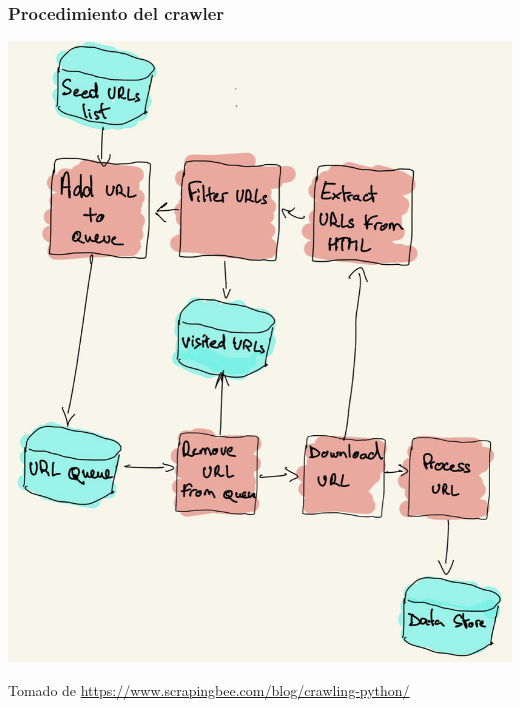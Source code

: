 \documentclass[
10pt, %
aspectratio=169, %
]{beamer}
\begin{document}
	\begin{frame}
		
		\frametitle{Procedimiento del crawler}
		
		\centering 
		\includegraphics[scale=0.3]{arq-crawler.png}
		
		{\scriptsize Tomado de \url{https://www.scrapingbee.com/blog/crawling-python/}}
		
	\end{frame}
	
\end{document}
